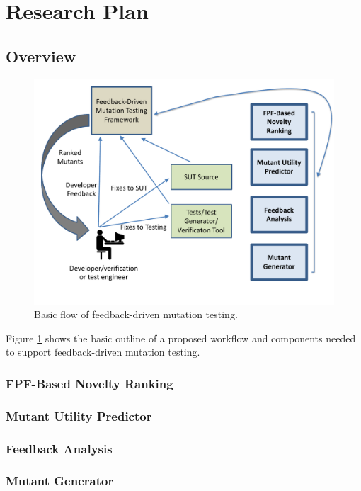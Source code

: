 \section{Research Plan}

\subsection{Overview}

\begin{figure}[t]
\centering
\includegraphics[width=0.8\columnwidth]{TestFlow}

\caption{Basic flow of feedback-driven mutation testing.}
\label{fig:flow}
\end{figure}

Figure \ref{fig:flow} shows the basic outline of a proposed workflow
and components needed to support feedback-driven mutation testing.

\subsubsection{FPF-Based Novelty Ranking}
\label{sec:fpfplan}

\subsubsection{Mutant Utility Predictor}

\subsubsection{Feedback Analysis}

\subsubsection{Mutant Generator}


